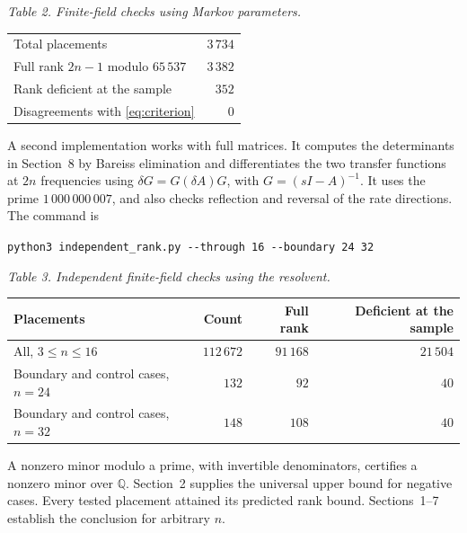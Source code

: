 \documentclass[11pt,a4paper]{article}
\begin{document}
\begin{center}
\begin{minipage}{\linewidth}\centering
{\small\itshape Table 2. Finite-field checks using Markov parameters.\par}\smallskip
\begin{tabular}{lr}
\toprule
Total placements & \(3\,734\)\\
Full rank \(2n-1\) modulo \(65\,537\) & \(3\,382\)\\
Rank deficient at the sample & \(352\)\\
Disagreements with \eqref{eq:criterion} & \(0\)\\
\bottomrule
\end{tabular}
\end{minipage}
\end{center}
A second implementation works with full matrices. It computes the determinants in Section~8 by Bareiss elimination and differentiates the two transfer functions at \(2n\) frequencies using \(\delta G=G(\delta A)G\), with \(G=(sI-A)^{-1}\). It uses the prime \(1\,000\,000\,007\), and also checks reflection and reversal of the rate directions. The command is
\begin{center}
\verb|python3 independent_rank.py --through 16 --boundary 24 32|
\end{center}
\begin{center}
\begin{minipage}{\linewidth}\centering
{\small\itshape Table 3. Independent finite-field checks using the resolvent.\par}\smallskip
\begin{tabular}{lrrr}
\toprule
Placements & Count & Full rank & Deficient at the sample\\
\midrule
All, \(3\le n\le16\) & \(112\,672\) & \(91\,168\) & \(21\,504\)\\
Boundary and control cases, \(n=24\) & \(132\) & \(92\) & \(40\)\\
Boundary and control cases, \(n=32\) & \(148\) & \(108\) & \(40\)\\
\bottomrule
\end{tabular}
\end{minipage}
\end{center}
A nonzero minor modulo a prime, with invertible denominators, certifies a nonzero minor over \(\mathbb Q\). Section~2 supplies the universal upper bound for negative cases. Every tested placement attained its predicted rank bound. Sections~1--7 establish the conclusion for arbitrary \(n\).
\end{document}
